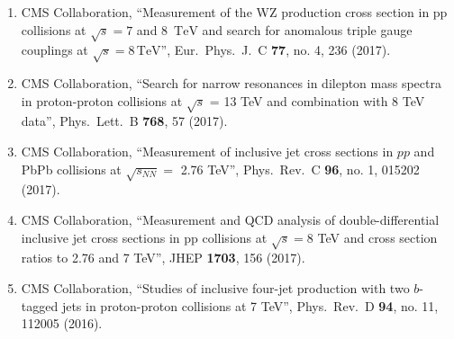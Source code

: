 \begin{itemize}
\begin{enumerate}
\item CMS Collaboration, ``Measurement of the WZ production cross section in pp collisions at $\sqrt{s} = 7$ and 8 $\,\text{TeV}$ and search for anomalous triple gauge couplings at $\sqrt{s} = 8\,\text{TeV} $'', Eur.\ Phys.\ J.\ C {\bf 77}, no. 4, 236 (2017).

\item CMS Collaboration, ``Search for narrow resonances in dilepton mass spectra in proton-proton collisions at $\sqrt{s}$ = 13 TeV and combination with 8 TeV data'', Phys.\ Lett.\ B {\bf 768}, 57 (2017).

\item CMS Collaboration, ``Measurement of inclusive jet cross sections in $pp$ and PbPb collisions at $\sqrt{s_{NN}}=$ 2.76 TeV'', Phys.\ Rev.\ C {\bf 96}, no. 1, 015202 (2017).

\item CMS Collaboration, ``Measurement and QCD analysis of double-differential inclusive jet cross sections in pp collisions at $ \sqrt{s}=8 $ TeV and cross section ratios to 2.76 and 7 TeV'', JHEP {\bf 1703}, 156 (2017).

\item CMS Collaboration, ``Studies of inclusive four-jet production with two $b$-tagged jets in proton-proton collisions at 7 TeV'', Phys.\ Rev.\ D {\bf 94}, no. 11, 112005 (2016).


\end{enumerate}
\end{itemize}

